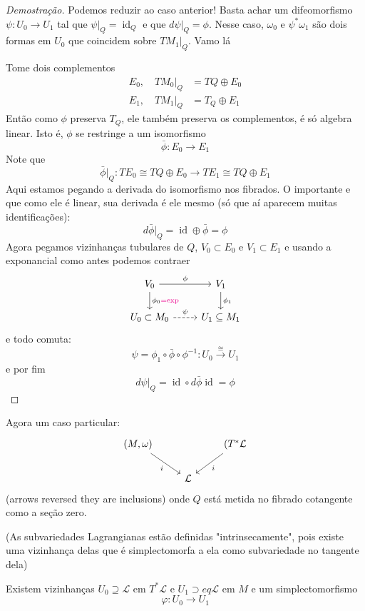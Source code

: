 \begin{proof}[Demostra\c c\~ao]
	Podemos reduzir ao caso anterior! Basta achar um difeomorfismo $\psi:U_0\to U_1$ tal que $\psi|_{Q}=\operatorname{id}_Q$ e que $d\psi|_{Q}=\phi$. Nesse caso, $\omega_0$ e $\psi^*\omega_1$ s\~ao dois formas em $U_0$ que coincidem sobre $TM_1|_{Q}$. Vamo l\'a

	Tome dois complementos
	 \begin{align*}
		E_0,\quad TM_0|_{Q}&=TQ\oplus E_0\\
		E_1,\quad TM_1|_{Q}&=T_Q\oplus E_1
	\end{align*}
	Ent\~ao como $\phi$ preserva $T_Q$, ele tamb\'em preserva os complementos, \'e s\'o algebra linear. Isto \'e, $\phi$ se restringe a um isomorfismo
	\[\bar{\phi} :E_0\to E_1\]
	Note que
	\[ \bar{\phi}|_{Q} :TE_0\cong TQ\oplus E_0\to TE_1\cong TQ\oplus E_1\]
	Aqui estamos pegando a derivada do isomorfismo nos fibrados. O importante e que como ele \'e linear, sua derivada \'e ele mesmo (s\'o que a\'i aparecem muitas identifica\c c\~oes):
	\[d\bar{\phi}|_{Q}=\operatorname{id}\oplus \bar{\phi} =\phi\]
Agora pegamos vizinhanças tubulares de $Q$, $V_0\subset E_0$ e $V_1\subset E_1$ e usando a exponancial como antes podemos contraer
\[\begin{tikzcd}
	V_0\arrow[r,"\phi"]\arrow[d,"\phi_0{\color{magenta}= \operatorname{exp}}"]&V_1\arrow[d,"\phi_1"]\\
	U_0\subset M_0\arrow[r,"\psi",dashed]&U_1\subseteq M_1
\end{tikzcd}\]
e todo comuta:
\[\psi=\phi_1\circ \bar{\phi} \circ \phi^{-1}:U_0\overset{\cong }{\longrightarrow} U_1\]
e por fim
\[d\psi|_{Q}=\operatorname{id}\circ d \bar{\phi} \operatorname{id}=\phi\]
\end{proof}

Agora um caso particular:
\[\begin{tikzcd}
	(M,\omega)\arrow[dr,"i",swap]&&(T^*\mathcal{L}\arrow[dl,"i"]\\
&\mathcal{L}
\end{tikzcd}\]
(arrows reversed they are inclusions) onde $Q$ est\'a metida no fibrado cotangente como a se\c c\~ao zero.

\begin{thm}\leavevmode
	(As subvariedades Lagrangianas est\~ao definidas "intrinsecamente", pois existe uma vizinhança delas que \'e simplectomorfa a ela como subvariedade no tangente dela)

	Existem vizinhanças $U_0\supseteq \mathcal{L}$ em $T^*\mathcal{L}$ e $U_1\supset eq \mathcal{L}$ em $M$ e um simplectomorfismo
	\[\varphi:U_0\to U_1\]
\end{thm}

